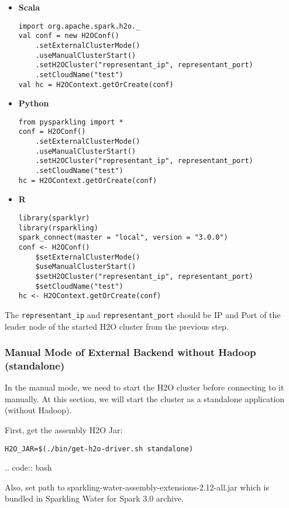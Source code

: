 \begin{itemize}
    \item \textbf{Scala} \begin{lstlisting}[style=Scala]
import org.apache.spark.h2o._
val conf = new H2OConf()
    .setExternalClusterMode()
    .useManualClusterStart()
    .setH2OCluster("representant_ip", representant_port)
    .setCloudName("test")
val hc = H2OContext.getOrCreate(conf)
    \end{lstlisting}
    \item \textbf{Python} \begin{lstlisting}[style=Python]
from pysparkling import *
conf = H2OConf()
    .setExternalClusterMode()
    .useManualClusterStart()
    .setH2OCluster("representant_ip", representant_port)
    .setCloudName("test")
hc = H2OContext.getOrCreate(conf)
    \end{lstlisting}
    \item \textbf{R} \begin{lstlisting}[style=R]
library(sparklyr)
library(rsparkling)
spark_connect(master = "local", version = "3.0.0")
conf <- H2OConf()
    $setExternalClusterMode()
    $useManualClusterStart()
    $setH2OCluster("representant_ip", representant_port)
    $setCloudName("test")
hc <- H2OContext.getOrCreate(conf)
    \end{lstlisting}
\end{itemize}


The \texttt{representant\_ip} and \texttt{representant\_port} should be IP and Port of the leader node of the started
H2O cluster from the previous step.

\subsubsection{Manual Mode of External Backend without Hadoop (standalone)}

In the manual mode, we need to start the H2O cluster before connecting to it manually. At this section, we will start
the cluster as a standalone application (without Hadoop).

First, get the assembly H2O Jar:

\begin{lstlisting}[style=bash]
H2O_JAR=$(./bin/get-h2o-driver.sh standalone)
\end{lstlisting}

.. code:: bash


Also, set path to sparkling-water-assembly-extensions-2.12-all.jar which is bundled in Sparkling Water for Spark 3.0 archive.

